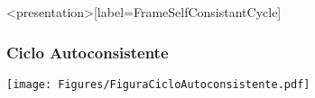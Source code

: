\begin{frame}<presentation>[label=FrameSelfConsistantCycle]
  \frametitle{Ciclo Autoconsistente}
  \centering
  \texttt{[image: Figures/FiguraCicloAutoconsistente.pdf]}

\end{frame}

